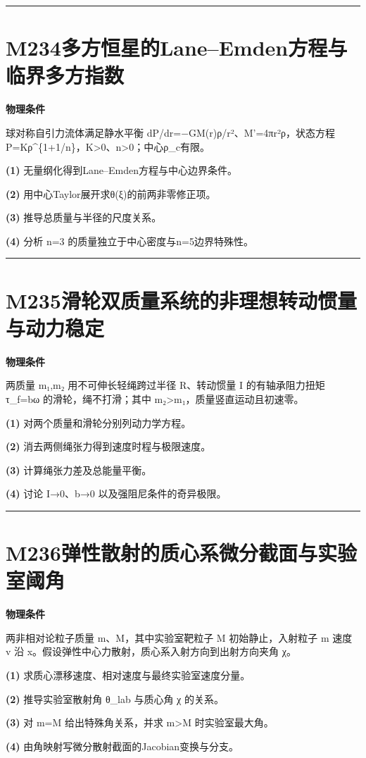 \documentclass[UTF8,a4paper,11pt,oneside,openany]{ctexbook}
\begin{document}
\par\bigskip\hrule\bigskip
\section*{M234\quad 多方恒星的Lane–Emden方程与临界多方指数}
\textbf{物理条件}\par 球对称自引力流体满足静水平衡 dP/dr=−GM(r)ρ/r²、M'=4πr²ρ，状态方程 P=Kρ\textasciicircum{}\{1+1/n\}，K>0、n>0；中心ρ\_c有限。
\par\noindent\textbf{(1)} 无量纲化得到Lane–Emden方程与中心边界条件。
\par\noindent\textbf{(2)} 用中心Taylor展开求θ(ξ)的前两非零修正项。
\par\noindent\textbf{(3)} 推导总质量与半径的尺度关系。
\par\noindent\textbf{(4)} 分析 n=3 的质量独立于中心密度与n=5边界特殊性。

\par\bigskip\hrule\bigskip
\section*{M235\quad 滑轮双质量系统的非理想转动惯量与动力稳定}
\textbf{物理条件}\par 两质量 m₁,m₂ 用不可伸长轻绳跨过半径 R、转动惯量 I 的有轴承阻力扭矩 τ\_f=bω 的滑轮，绳不打滑；其中 m₂>m₁，质量竖直运动且初速零。
\par\noindent\textbf{(1)} 对两个质量和滑轮分别列动力学方程。
\par\noindent\textbf{(2)} 消去两侧绳张力得到速度时程与极限速度。
\par\noindent\textbf{(3)} 计算绳张力差及总能量平衡。
\par\noindent\textbf{(4)} 讨论 I→0、b→0 以及强阻尼条件的奇异极限。

\par\bigskip\hrule\bigskip
\section*{M236\quad 弹性散射的质心系微分截面与实验室阈角}
\textbf{物理条件}\par 两非相对论粒子质量 m、M，其中实验室靶粒子 M 初始静止，入射粒子 m 速度 v 沿 x。假设弹性中心力散射，质心系入射方向到出射方向夹角 χ。
\par\noindent\textbf{(1)} 求质心漂移速度、相对速度与最终实验室速度分量。
\par\noindent\textbf{(2)} 推导实验室散射角 θ\_lab 与质心角 χ 的关系。
\par\noindent\textbf{(3)} 对 m=M 给出特殊角关系，并求 m>M 时实验室最大角。
\par\noindent\textbf{(4)} 由角映射写微分散射截面的Jacobian变换与分支。
\end{document}
